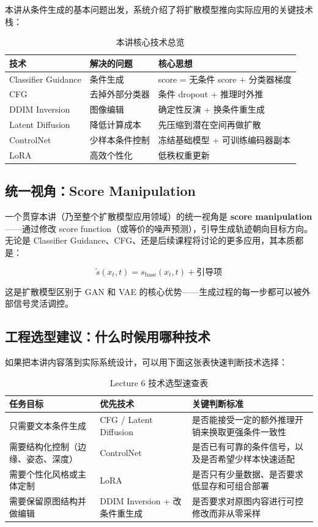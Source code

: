 \documentclass[a4paper]{article}
\begin{document}
本讲从条件生成的基本问题出发，系统介绍了将扩散模型推向实际应用的关键技术栈：

\begin{table}[H]
\centering
\begin{tabular}{lp{4.5cm}p{4.5cm}}
\toprule
\textbf{技术} & \textbf{解决的问题} & \textbf{核心思想} \\
\midrule
Classifier Guidance & 条件生成 & score = 无条件 score + 分类器梯度 \\
CFG & 去掉外部分类器 & 条件 dropout + 推理时外推 \\
DDIM Inversion & 图像编辑 & 确定性反演 + 换条件重生成 \\
Latent Diffusion & 降低计算成本 & 先压缩到潜在空间再做扩散 \\
ControlNet & 少样本条件控制 & 冻结基础模型 + 可训练编码器副本 \\
LoRA & 高效个性化 & 低秩权重更新 \\
\bottomrule
\end{tabular}
\caption{本讲核心技术总览}
\end{table}

\subsection{统一视角：Score Manipulation}

一个贯穿本讲（乃至整个扩散模型应用领域）的统一视角是 \textbf{score manipulation}——通过修改 score function（或等价的噪声预测），引导生成轨迹朝向目标方向。无论是 Classifier Guidance、CFG、还是后续课程将讨论的更多应用，其本质都是：

$$
\tilde{s}(x_t, t) = s_{\text{base}}(x_t, t) + \text{引导项}
$$

这是扩散模型区别于 GAN 和 VAE 的核心优势——生成过程的每一步都可以被外部信号灵活调控。

\subsection{工程选型建议：什么时候用哪种技术}

如果把本讲内容落到实际系统设计，可以用下面这张表快速判断技术选择：

\begin{table}[H]
\centering
\begin{tabular}{p{} p{} p{}}
\toprule
任务目标 & 优先技术 & 关键判断标准 \\
\midrule
只需要文本条件生成 & CFG / Latent Diffusion & 是否能接受一定的额外推理开销来换取更强条件一致性 \\
需要结构化控制（边缘、姿态、深度） & ControlNet & 是否已有可靠的条件信号，以及是否希望少样本快速适配 \\
需要个性化风格或主体定制 & LoRA & 是否只有少量数据、是否要求低显存和可组合部署 \\
需要保留原图结构并做编辑 & DDIM Inversion + 改条件重生成 & 是否要求对原图内容进行可控修改而非从零采样 \\
\bottomrule
\end{tabular}
\caption{Lecture 6 技术选型速查表}
\end{table}
\end{document}
